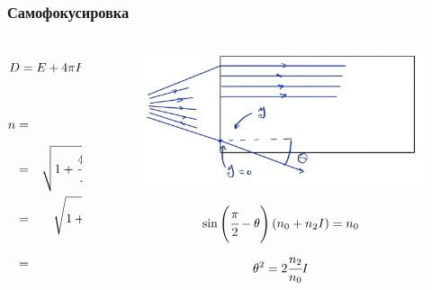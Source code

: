 \documentclass[handout]{beamer}
\newcommand{\inner}[1]{\left( #1 \right)}
\renewcommand{\epsilon}{\varepsilon}
\begin{document}
\begin{frame}
\begin{columns}
      \end{columns}
\end{frame}

\begin{frame}
    \frametitle{Самофокусировка}
    \begin{columns}
        \begin{column}{0.5\textwidth}
            \begin{equation*}
                D = E + 4 \pi P = \inner{1 + 4\pi \cfrac{P}{E}} E = \epsilon E
            \end{equation*}

            \begin{eqnarray*}
                n & = & \sqrt{1 + 4\pi \cfrac{P}{E}} = \\
                & = &\sqrt{1 + \cfrac{4 \pi}{E} \inner{\kappa_1 E + \cfrac{3}{4} \kappa_2 E^3}} \approx \\
                & = & \sqrt{1 + \cfrac{4 \pi}{E} \kappa_1} + \cfrac{3/4\kappa_2 E^2}{2\sqrt{1 + \cfrac{4 \pi}{E} \kappa_1}}  \\
                & = &n_0 + n_1 I
            \end{eqnarray*}
        \end{column}
        \begin{column}{0.5\textwidth}
            \begin{figure}[h]
                \centering
                \includegraphics[width=1\textwidth]{self_foc.png}
            \end{figure}
            \begin{equation*}
                \sin \inner{\cfrac{\pi}{2}-\theta} \inner{n_0 + n_2 I}=n_0 
            \end{equation*}
            \begin{equation*}
                \theta^2 = 2\cfrac{n_2}{n_0}I
            \end{equation*}
        \end{column}
    \end{columns}
\end{frame}
\end{document}
